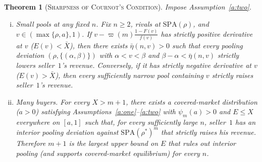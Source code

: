 \documentclass[12pt]{article}
\theoremstyle{mystyle}
\newtheorem{theorem}{Theorem}
\theoremstyle{mystyle2}
\newcommand{\SPA}{\mathrm{SPA}}
\newcommand{\1}{\mathbf{1}}
\begin{document}
\begin{theorem}[\textsc{Sharpness of Cournot's Condition}]\label{thm:sharp}
Impose Assumption~\ref{a:two}.
\begin{enumerate}[(i)]
\item \emph{Small pools at any fixed $n$.} Fix $n\ge 2$, rivals at $\SPA(\rho)$, and $v\in(\max\{\rho,a\},1)$. If $v-\varpi(m)\frac{1-F(v)}{f(v)}$ has strictly positive derivative at $v$ ($E(v)<\bar X$), then there exists $\bar\eta(n,v)>0$ such that every pooling deviation $(\rho,\{(\alpha,\beta)\})$ with $\alpha<v<\beta$ and $\beta-\alpha<\bar\eta(n,v)$ strictly lowers seller~$1$'s revenue. Conversely, if it has strictly negative derivative at $v$ ($E(v)>\bar X$), then every sufficiently narrow pool containing $v$ strictly raises seller~$1$'s revenue.
\item \emph{Many buyers.} For every $X>m+1$, there exists a covered-market distribution ($a>0$) satisfying Assumptions~\ref{a:one}--\ref{a:two} with $\psi_m(a)>0$ and $E\le X$ everywhere on $[a,1]$ such that, for every sufficiently large $n$, seller~$1$ has an interior pooling deviation against $\SPA(\rho^*)^m$ that strictly raises his revenue. Therefore $m+1$ is the largest upper bound on $E$ that rules out interior pooling (and supports covered-market equilibrium) for every $n$.
\end{enumerate}
\end{theorem}
\end{document}
